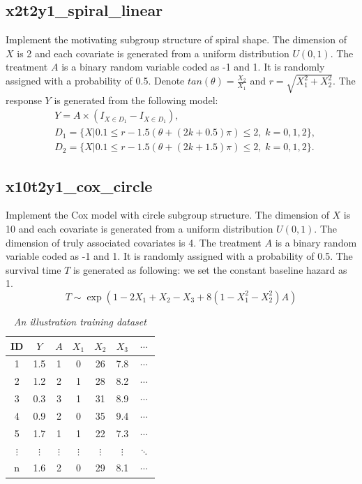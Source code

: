 \documentclass[12pt]{article}
\begin{document}
\subsection*{x2t2y1\_spiral\_linear}
Implement the motivating subgroup structure of spiral shape. The dimension of $X$ is 2 and each covariate is generated from a uniform distribution $U(0,1)$. The treatment $A$ is a binary random variable coded as -1 and 1. It is randomly assigned with a probability of 0.5.
Denote $tan(\theta) = \frac{X_2}{X_1}$ and $r = \sqrt{X_1^2+X_2^2}$.
The response $Y$ is generated from the following model: 
\begin{align*}
&Y = A\times (I_{X\in D_1}-I_{X\in D_1}) , \\
&D_1 = \big\{X|0.1\leq r - 1.5(\theta+(2k+0.5)\pi)\leq 2,\;k=0,1,2 \big\}, \\
&D_2 = \big\{X|0.1\leq r - 1.5(\theta+(2k+1.5)\pi)\leq 2,\;k=0,1,2 \big\}.
\end{align*}

\subsection*{x10t2y1\_cox\_circle}
Implement the Cox model with circle subgroup structure. The dimension of $X$ is 10 and each covariate is generated from a uniform distribution $U(0,1)$. The dimension of truly associated covariates is 4. The treatment $A$ is a binary random variable coded as -1 and 1. It is randomly assigned with a probability of 0.5. The survival time $T$ is generated as following: we set the constant baseline hazard as 1.
$$T \sim \exp(1 -2X_1 + X_2 -X_3 + 8(1-X_1^2-X_2^2)A )$$
 









\newpage

\begin{table}[htbp]
  \centering
  \caption{\emph{An illustration training dataset}}
    \begin{tabular}{c|c|c|cccc}
    \hline
    \hline
    ID & $Y$     & $A$   & $X_1$    & $X_2$    & $X_3$    & $\cdots$ \\
    \hline
    1&1.5  & 1     & 0     & 26    & 7.8   & $\cdots$ \\
    2&1.2  & 2     & 1     & 28    & 8.2   & $\cdots$  \\
    3&0.3  & 3     & 1     & 31    & 8.9   & $\cdots$  \\
    4&0.9  & 2     & 0     & 35    & 9.4   & $\cdots$  \\
    5&1.7  & 1     & 1     & 22    & 7.3   & $\cdots$  \\
    $\vdots$ & $\vdots$    & $\vdots$    & $\vdots$   & $\vdots$     & $\vdots$     & $\ddots$  \\
    n & 1.6 & 2 & 0 & 29 & 8.1 & $\cdots$ \\
    \hline
    \hline
    \end{tabular}%
  \label{tab:TrainingDataExample}%
\end{table}%
\end{document}
